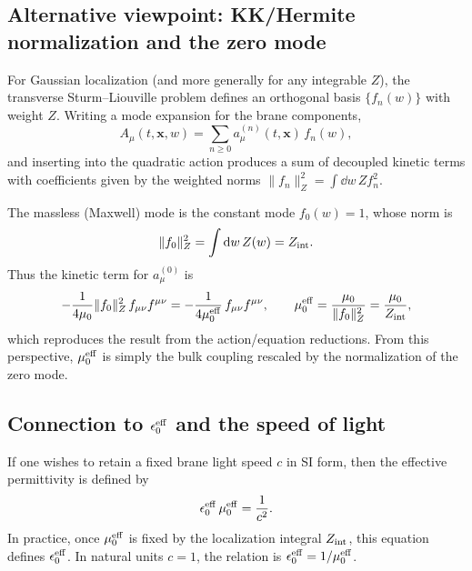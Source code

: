 \documentclass[11pt]{article}
\begin{document}
\subsection{Alternative viewpoint: KK/Hermite normalization and the zero mode}
\label{app:mode_normalization_mu0eff}

For Gaussian localization (and more generally for any integrable \(Z\)), the transverse
Sturm--Liouville problem defines an orthogonal basis \(\{f_n(w)\}\) with weight \(Z\).
Writing a mode expansion for the brane components,
\begin{equation}
A_\mu(t,\mathbf{x},w)=\sum_{n\ge 0} a_\mu^{(n)}(t,\mathbf{x})\,f_n(w),
\label{eq:app_mode_expansion}
\end{equation}
and inserting into the quadratic action produces a sum of decoupled kinetic terms with
coefficients given by the weighted norms \(\|f_n\|_Z^2=\int \dd w\,Z f_n^2\).

The massless (Maxwell) mode is the constant mode \(f_0(w)=1\), whose norm is
\begin{equation}
\|f_0\|_Z^2 = \int \dd w\,Z(w) = Z_{\rm int}.
\label{eq:app_f0_norm}
\end{equation}
Thus the kinetic term for \(a_\mu^{(0)}\) is
\begin{equation}
-\frac{1}{4\mu_0}\|f_0\|_Z^2\,f_{\mu\nu}f^{\mu\nu}
=
-\frac{1}{4\mu_0^{\rm eff}}\,f_{\mu\nu}f^{\mu\nu},
\qquad
\mu_0^{\rm eff}=\frac{\mu_0}{\|f_0\|_Z^2}=\frac{\mu_0}{Z_{\rm int}},
\label{eq:app_mu0eff_from_modes}
\end{equation}
which reproduces the result from the action/equation reductions.
From this perspective, \(\mu_0^{\rm eff}\) is simply the bulk coupling rescaled by the
normalization of the zero mode.

\subsection{Connection to \texorpdfstring{$\epsilon_0^{\rm eff}$}{eps0eff} and the speed of light}
\label{app:eps0eff}

If one wishes to retain a fixed brane light speed \(c\) in SI form, then the effective
permittivity is defined by
\begin{equation}
\epsilon_0^{\rm eff}\,\mu_0^{\rm eff} = \frac{1}{c^2}.
\label{eq:app_eps0eff_def}
\end{equation}
In practice, once \(\mu_0^{\rm eff}\) is fixed by the localization integral \(Z_{\rm int}\),
this equation defines \(\epsilon_0^{\rm eff}\). In natural units \(c=1\), the relation is
\(\epsilon_0^{\rm eff}=1/\mu_0^{\rm eff}\).
\end{document}
